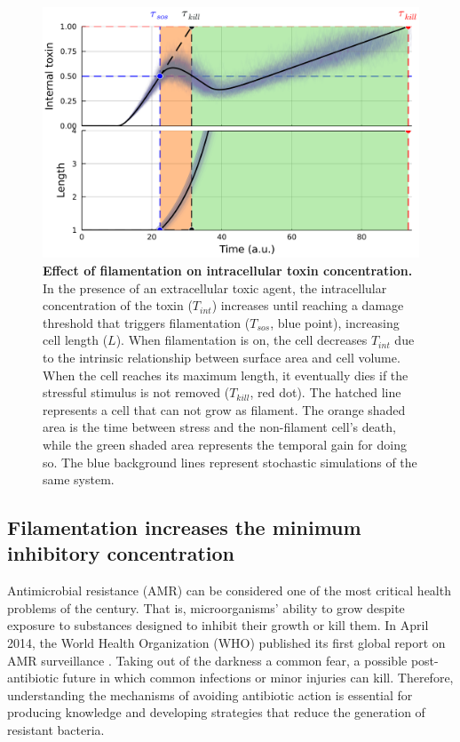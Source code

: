 \documentclass[a4paper, nobind]{templates/ociamthesis}
\begin{document}
\begin{figure}[H]
\includegraphics[width=1\linewidth]{downloadFigs4latex__main/filamentation-model-ramp-signal} \caption[Effect of filamentation on intracellular toxin concentration.]{\textbf{Effect of filamentation on intracellular toxin concentration.} In the presence of an extracellular toxic agent, the intracellular concentration of the toxin (\(T_{int}\)) increases until reaching a damage threshold that triggers filamentation (\(T_{sos}\), blue point), increasing cell length (\(L\)). When filamentation is on, the cell decreases \(T_{int}\) due to the intrinsic relationship between surface area and cell volume. When the cell reaches its maximum length, it eventually dies if the stressful stimulus is not removed (\(T_{kill}\), red dot). The hatched line represents a cell that can not grow as filament. The orange shaded area is the time between stress and the non-filament cell's death, while the green shaded area represents the temporal gain for doing so. The blue background lines represent stochastic simulations of the same system.}\label{fig:filamentation-model-ramp-signal}
\end{figure}

\hypertarget{filamentation-increases-the-minimum-inhibitory-concentration}{%
\subsection{Filamentation increases the minimum inhibitory concentration}\label{filamentation-increases-the-minimum-inhibitory-concentration}}

Antimicrobial resistance (AMR) can be considered one of the most critical health problems of the century. That is, microorganisms' ability to grow despite exposure to substances designed to inhibit their growth or kill them. In April 2014, the World Health Organization (WHO) published its first global report on AMR surveillance \autocite{EditorialBoard2014}. Taking out of the darkness a common fear, a possible post-antibiotic future in which common infections or minor injuries can kill. Therefore, understanding the mechanisms of avoiding antibiotic action is essential for producing knowledge and developing strategies that reduce the generation of resistant bacteria.
\end{document}
